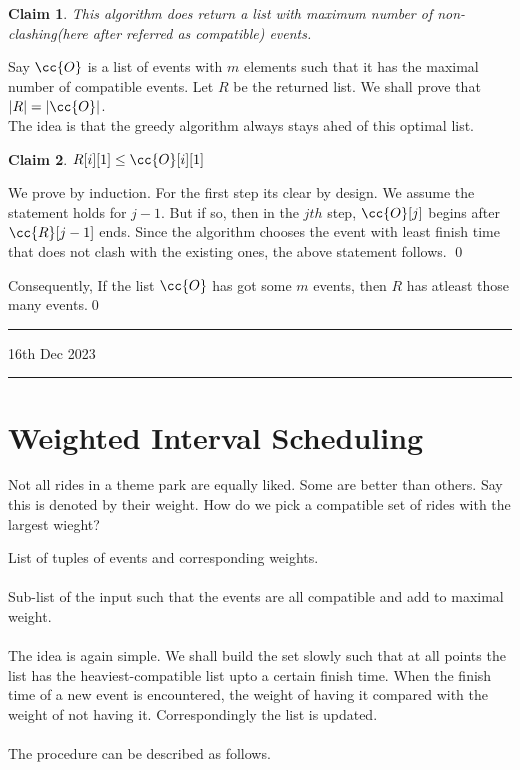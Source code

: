 \documentclass{myclass}
\newtheorem*{claim}{Claim}
\begin{document}
\begin{claim}
    This algorithm does return a list with maximum number of non-clashing(here after referred as compatible)
    events.
\end{claim}

\begin{prf}
    Say $\cc{O}$ is a list of events with $m$ elements such that it has the maximal number of compatible events.
    Let $R$ be the returned list. We shall prove that $|R|=|\cc{O}|$.\\
    The idea is that the greedy algorithm always stays ahed of this optimal list.

    \begin{claim}
        $R[i][1]\leq\cc{O}[i][1]$
    \end{claim}
    \begin{subprf}
        We prove by induction. For the first step its clear by design. We assume the statement holds for $j-1$. 
        But if so, then in the $jth$ step, $\cc{O}[j]$ begins after $\cc{R}[j-1]$ ends. Since the algorithm chooses the event with least finish
        time that does not clash with the existing ones, the above statement follows.
        \qed
    \end{subprf}

    Consequently, If the list $\cc{O}$ has got some $m$ events, then $R$ has atleast those many events.\qed
\end{prf}

\hrule
\vspace{-0.15cm}
\begin{flushleft}
    16th Dec 2023
\end{flushleft}
\vspace{-0.15cm}
\hrule

\section*{Weighted Interval Scheduling}

Not all rides in a theme park are equally liked. Some are better than others. Say this is denoted by their weight.
How do we pick a compatible set of rides with the largest wieght?

 List of tuples of events and corresponding weights.
\\\\
 Sub-list of the input such that the events are all compatible and 
add to maximal weight.
\\\\
The idea is again simple. We shall build the set slowly such that at all points 
the list has the heaviest-compatible list upto a certain finish time. When the finish time of a new event is encountered, the weight of having it compared with the
weight of not having it. Correspondingly the list is updated.
\\\\
The procedure can be described as follows.
\end{document}
